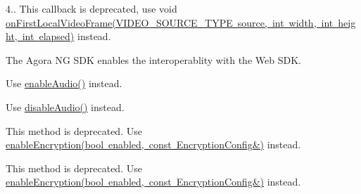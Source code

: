 \begin{DoxyRefList}
%
4.. This callback is deprecated, use void \mbox{\hyperlink{classagora_1_1rtc_1_1_i_rtc_engine_event_handler_a15cb3afe45c869c129451c54b4383619}{on\+First\+Local\+Video\+Frame(\+V\+I\+D\+E\+O\+\_\+\+S\+O\+U\+R\+C\+E\+\_\+\+T\+Y\+P\+E source, int width, int height, int elapsed)}} instead. 
\item[Member \mbox{\hyperlink{classagora_1_1rtc_1_1_i_rtc_engine_a5ac70d12ca9b204410c02a9cc1159606}{agora\+::rtc\+::I\+Rtc\+Engine\+::enable\+Web\+Sdk\+Interoperability}} (bool enabled) \+\_\+\+\_\+deprecated=0]\label{deprecated__deprecated000020}%
%
The Agora NG S\+DK enables the interoperablity with the Web S\+DK. 
\item[Member \mbox{\hyperlink{classagora_1_1rtc_1_1_i_rtc_engine_a566a23231286f5286fdb137966093e9f}{agora\+::rtc\+::I\+Rtc\+Engine\+::resume\+Audio}} () \+\_\+\+\_\+deprecated=0]\label{deprecated__deprecated000019}%
%
Use \mbox{\hyperlink{classagora_1_1rtc_1_1_i_rtc_engine_a996401c7ba33c6ec59527c5d109f548f}{enable\+Audio()}} instead. 
\item[Member \mbox{\hyperlink{classagora_1_1rtc_1_1_i_rtc_engine_a7729c859bb2ae7f565ab7a57cf7b6158}{agora\+::rtc\+::I\+Rtc\+Engine\+::pause\+Audio}} () \+\_\+\+\_\+deprecated=0]\label{deprecated__deprecated000018}%
%
Use \mbox{\hyperlink{classagora_1_1rtc_1_1_i_rtc_engine_a1929f01411e983ed776275fe8e8ad45e}{disable\+Audio()}} instead. 
\item[Member \mbox{\hyperlink{classagora_1_1rtc_1_1_i_rtc_engine_aab978f8dbbffab2828b0ce856c8be529}{agora\+::rtc\+::I\+Rtc\+Engine\+::set\+Encryption\+Secret}} (const char $\ast$secret) \+\_\+\+\_\+deprecated=0]\label{deprecated__deprecated000017}%
%
This method is deprecated. Use \mbox{\hyperlink{classagora_1_1rtc_1_1_i_rtc_engine_ad5ea5f0dfd8117f38d9c4b12fe01fece}{enable\+Encryption(bool enabled, const Encryption\+Config\&)}} instead. 
\item[Member \mbox{\hyperlink{classagora_1_1rtc_1_1_i_rtc_engine_a8ff6889c4e3d86a15b7dea0ae13a5300}{agora\+::rtc\+::I\+Rtc\+Engine\+::set\+Encryption\+Mode}} (const char $\ast$encryption\+Mode) \+\_\+\+\_\+deprecated=0]\label{deprecated__deprecated000016}%
%
This method is deprecated. Use \mbox{\hyperlink{classagora_1_1rtc_1_1_i_rtc_engine_ad5ea5f0dfd8117f38d9c4b12fe01fece}{enable\+Encryption(bool enabled, const Encryption\+Config\&)}} instead. 

\end{DoxyRefList}
